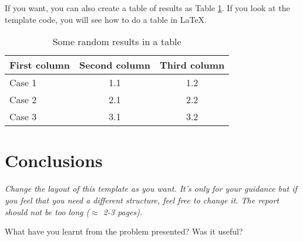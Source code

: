 \documentclass[a4paper, 11pt]{article}
\begin{document}
If you want, you can also create a table of results as Table
\ref{tab:results}. If you look at the template code, you will see how
to do a table in \LaTeX.

\begin{table}[h]
\centering
\begin{tabular}{lcc}
First column & Second column & Third column\\\hline
Case 1 & 1.1 & 1.2\\\hline
Case 2 & 2.1 & 2.2\\\hline
Case 3 & 3.1 & 3.2\\\hline
\end{tabular}
\caption{Some random results in a table}
\label{tab:results}
\end{table}

\section{Conclusions}

\textit{Change the layout of this template as you want. It's only for
  your guidance but if you feel that you need a different structure,
  feel free to change it. The report should not be too long ($\approx$
  2-3 pages).}

What have you learnt from the problem presented?
Was it useful?
\end{document}
